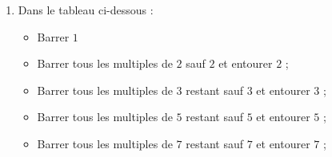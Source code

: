 \begin{corrige}
    \begin{enumerate}
        \item Dans le tableau ci-dessous :
        \begin{itemize}
            \item Barrer $1$
            \item Barrer tous les multiples de $2$ sauf $2$ et entourer $2$ ;
            \item Barrer tous les multiples de $3$ restant sauf $3$ et entourer $3$ ;
            \item Barrer tous les multiples de $5$ restant sauf $5$ et entourer $5$ ;
            \item Barrer tous les multiples de $7$ restant sauf $7$ et entourer $7$ ;
        \end{itemize}


\end{enumerate}
\end{corrige}
